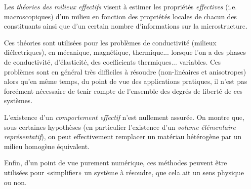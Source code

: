\medskip
\begin{histoire}%
Les \emph{théories des milieux effectifs} visent à estimer les propriétés \emph{effectives} (i.e. macroscopiques) d'un milieu en fonction des propriétés locales de chacun des constituants ainsi que d'un certain nombre d'informations sur la microstructure.\ifVersionDuDocEstVincent\else\\[-2.5mm]\fi


\medskip
{}

\medskip
Ces théories sont utilisées pour les problèmes de conductivité (milieux diélectriques), en mécanique, magnétique, thermique... lorsque l'on a des phases de conductivité, d'élasticité, des coefficients thermiques... variables. Ces problèmes sont en général très difficiles à résoudre (non-linéaires et anisotropes) alors qu'en même temps, du point de vue des applications pratiques, il n'est pas forcément nécessaire de tenir compte de l'ensemble des degrés de liberté de ces systèmes.

\medskip
L'existence d'un \emph{comportement effectif} n'est nullement assurée. On montre que, sous certaines hypothèses (en particulier l'existence d'un \emph{volume élémentaire représentatif}), on peut effectivement remplacer un matériau hétérogène par un milieu homogène équivalent.

Enfin, d'un point de vue purement numérique, ces méthodes peuvent être utilisées pour «simplifier» un système à résoudre, que cela ait un sens physique ou non.
\end{histoire}

